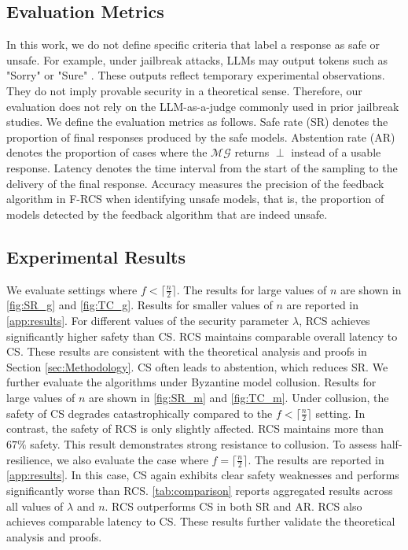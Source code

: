 \subsection{Evaluation Metrics}
In this work, we do not define specific criteria that label a response as safe or unsafe. For example, under jailbreak attacks, LLMs may output tokens such as "Sorry" or "Sure" \citep{wang-etal-2025-vulnerability}. These outputs reflect temporary experimental observations. They do not imply provable security in a theoretical sense. Therefore, our evaluation does not rely on the LLM-as-a-judge \citep{wei2025emoji} commonly used in prior jailbreak studies. We define the evaluation metrics as follows. Safe rate (SR) denotes the proportion of final responses produced by the safe models. Abstention rate (AR) denotes the proportion of cases where the $\mathcal{MG}$ returns $\perp$ instead of a usable response. Latency denotes the time interval from the start of the sampling to the delivery of the final response. Accuracy measures the precision of the feedback algorithm in F-RCS when identifying unsafe models, that is, the proportion of models detected by the feedback algorithm that are indeed unsafe.

\subsection{Experimental Results}
We evaluate settings where $f < \lceil \frac{n}{2} \rceil$. The results for large values of $n$ are shown in \autoref{fig:SR_g} and \autoref{fig:TC_g}. Results for smaller values of $n$ are reported in \autoref{app:results}. For different values of the security parameter $\lambda$, RCS achieves significantly higher safety than CS. RCS maintains comparable overall latency to CS. These results are consistent with the theoretical analysis and proofs in Section \ref{sec:Methodology}. CS often leads to abstention, which reduces SR. We further evaluate the algorithms under Byzantine model collusion. Results for large values of $n$ are shown in \autoref{fig:SR_m} and \autoref{fig:TC_m}. Under collusion, the safety of CS degrades catastrophically compared to the $f < \lceil \frac{n}{2} \rceil$ setting. In contrast, the safety of RCS is only slightly affected. RCS maintains more than $67\%$ safety. This result demonstrates strong resistance to collusion. To assess half-resilience, we also evaluate the case where $f = \lceil \frac{n}{2} \rceil$. The results are reported in \autoref{app:results}. In this case, CS again exhibits clear safety weaknesses and performs significantly worse than RCS. \autoref{tab:comparison} reports aggregated results across all values of $\lambda$ and $n$. RCS outperforms CS in both SR and AR. RCS also achieves comparable latency to CS. These results further validate the theoretical analysis and proofs.

